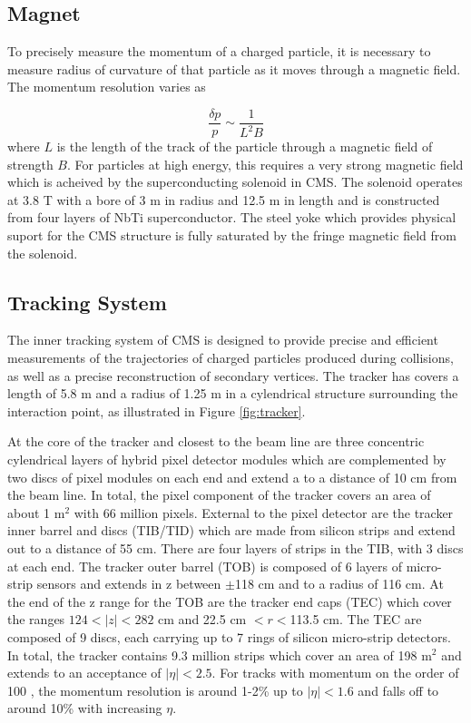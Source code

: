  \subsection{Magnet}
To precisely measure the momentum of a charged particle, 
 it is necessary to measure radius of curvature 
 of that particle as it moves through a magnetic field.
The momentum resolution varies as 

\begin{equation}\label{eq:res_mag}
\frac{\delta p}{p} \sim \frac{1}{L^2B}
\end{equation}
 where $L$ is the length of the track of the 
 particle through a magnetic field of
 strength $B$.
For particles at high energy, this requires a very strong
 magnetic field which is acheived by the superconducting 
 solenoid in CMS.
The solenoid operates at 3.8 T with 
 a bore of 3 m in radius and 12.5 m in length
 and is constructed from four layers of NbTi superconductor.
The steel yoke which provides physical suport for the 
 CMS structure is fully saturated by the fringe magnetic field
 from the solenoid.

 \subsection{Tracking System}
The inner tracking system of CMS is designed to provide
 precise and efficient measurements of the trajectories
 of charged particles produced during collisions,
 as well as a precise reconstruction of secondary vertices.
The tracker has covers a length of 5.8 m and a radius of
 1.25 m in a cylendrical structure surrounding the 
 interaction point, as illustrated in Figure \ref{fig:tracker}.

At the core of the tracker and closest to the beam line
 are three concentric cylendrical layers %
 of hybrid pixel detector modules which are complemented
 by two discs of pixel modules on each end
 and extend a to a distance of 10 cm from the beam line.
In total, the pixel component of the tracker covers
 an area of about 1 m$^2$ with 66 million pixels.
External to the pixel detector are the tracker inner barrel and discs (TIB/TID)
 which are made from silicon strips and extend 
 out to a distance of 55 cm.
There are four layers of strips in the TIB, with 3 discs at each end.
The tracker outer barrel (TOB) is composed of
 6 layers of micro-strip sensors and extends
 in z between $\pm$118 cm and to a radius of 116 cm.
At the end of the z range for the TOB are the
 tracker end caps (TEC) which cover the ranges
 $124<|z|<282$ cm and 22.5 cm $<r<$113.5 cm.
The TEC are composed of 9 discs,
 each carrying up to 7 rings of silicon micro-strip detectors.
In total, the tracker contains 9.3 million strips
 which cover an area of 198 m$^2$ and extends
 to an acceptance of $|\eta|<2.5$.
For tracks with momentum on the order of 100 \GeV,
 the momentum resolution is around 1-2\% up to $|\eta|<1.6$
 and falls off to around 10\% with increasing $\eta$.

